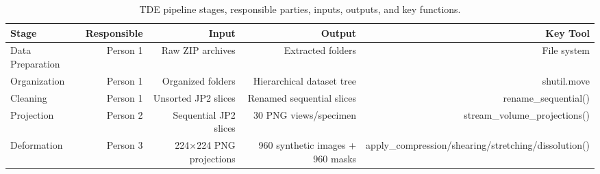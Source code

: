 \begin{table}[htbp]
\caption{TDE pipeline stages, responsible parties, inputs, outputs, and key functions.}
\label{tab:pipeline_stages}
\begin{tabular}{lrrrr}
\toprule
Stage & Responsible & Input & Output & Key Tool \\
\midrule
Data Preparation & Person 1 & Raw ZIP archives & Extracted folders & File system \\
Organization & Person 1 & Organized folders & Hierarchical dataset tree & shutil.move \\
Cleaning & Person 1 & Unsorted JP2 slices & Renamed sequential slices & rename\_sequential() \\
Projection & Person 2 & Sequential JP2 slices & 30 PNG views/specimen & stream\_volume\_projections() \\
Deformation & Person 3 & 224×224 PNG projections & 960 synthetic images + 960 masks & apply\_compression/shearing/stretching/dissolution() \\
\bottomrule
\end{tabular}
\end{table}
